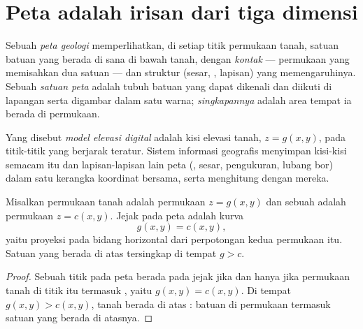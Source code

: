 \section{Peta adalah irisan dari tiga dimensi}\label{sec:b1:geological-maps:cut}

\begin{definition}\label{def:b1:geological-maps:geological-map}
Sebuah \emph{peta geologi} memperlihatkan, di setiap titik permukaan tanah, satuan batuan yang berada di sana di bawah tanah, dengan \emph{kontak} --- permukaan yang memisahkan dua satuan --- dan struktur (sesar, ,  lapisan) yang memengaruhinya. Sebuah \emph{satuan peta} adalah tubuh batuan yang dapat dikenali dan diikuti di lapangan serta digambar dalam satu warna; \emph{singkapannya} adalah area tempat ia berada di permukaan.
\end{definition}

\begin{definition}\label{def:b1:geological-maps:dem}
Yang disebut \emph{model elevasi digital} adalah kisi elevasi tanah, $z = g(x,y)$, pada titik-titik yang berjarak teratur. Sistem informasi geografis menyimpan kisi-kisi semacam itu dan lapisan-lapisan lain peta (, sesar, pengukuran, lubang bor) dalam satu kerangka koordinat bersama, serta menghitung dengan mereka.
\end{definition}

\begin{proposition}\label{prop:b1:geological-maps:intersection}
Misalkan permukaan tanah adalah permukaan $z = g(x,y)$ dan sebuah  adalah permukaan
$z = c(x,y)$. Jejak  pada peta adalah kurva
\[
  g(x,y) = c(x,y),
\]
yaitu proyeksi pada bidang horizontal dari perpotongan kedua permukaan itu. Satuan yang berada di atas  tersingkap di tempat $g > c$.
\end{proposition}

\begin{proof}
Sebuah titik pada peta berada pada jejak jika dan hanya jika permukaan tanah di titik itu termasuk , yaitu $g(x,y) = c(x,y)$. Di tempat $g(x,y) > c(x,y)$, tanah berada di atas : batuan di permukaan termasuk satuan yang berada di atasnya.
\end{proof}

